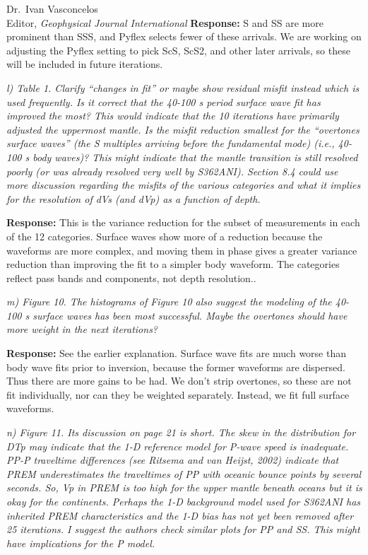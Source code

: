 \documentclass[11pt,a4paper]{letter}
\newcommand{\response}[1]{\textbf{Response:} #1}
\newcommand{\rev}[1]{{\it{#1}}}
\begin{document}
\begin{letter}{Dr.~Ivan Vasconcelos\\
Editor, \textit{Geophysical Journal International}}
\response{S and SS are more prominent than SSS, and Pyflex selects fewer of these arrivals. We are working on adjusting the Pyflex setting to pick ScS, ScS2, and other later arrivals, so these will be included in future iterations.}

\rev{l) Table 1. Clarify ``changes in fit'' or maybe show residual misfit instead which is used frequently. Is it correct that the 40-100 s period surface wave fit has improved the most? This would indicate that the 10 iterations have primarily adjusted the uppermost mantle.
Is the misfit reduction smallest for the ``overtones surface waves'' (the S multiples arriving before the fundamental mode) (i.e., 40-100 s body waves)?
This might indicate that the mantle transition is still resolved poorly (or was already resolved very well by S362ANI).
Section 8.4 could use more discussion regarding the misfits of the various categories and what it implies for the resolution of dVs (and dVp) as a function of depth.
}

\response{This is the variance reduction for the subset of measurements in each of the 12 categories. Surface waves show more of a reduction because the waveforms are more complex, and moving them in phase gives a greater variance reduction than improving the fit to a simpler body waveform. The categories reflect pass bands and components, not depth resolution..}

\rev{m) Figure 10. The histograms of Figure 10 also suggest the modeling of the 40-100 s surface waves has been most successful. Maybe the overtones should have more weight in the next iterations?
}

\response{See the earlier explanation.
Surface wave fits are much worse than body wave fits prior to inversion, because the former waveforms are dispersed.
Thus there are more gains to be had. We don't strip overtones, so these are not fit individually, nor can they be weighted separately.
Instead, we fit full surface waveforms.
}

\rev{n) Figure 11. Its discussion on page 21 is short. The skew in the distribution for DTp may indicate that the 1-D reference model for P-wave speed is inadequate. PP-P traveltime differences (see Ritsema and van Heijst, 2002) indicate that PREM underestimates the traveltimes of PP with oceanic bounce points by several seconds.
So, Vp in PREM is too high for the upper mantle beneath oceans but it is okay for the continents. Perhaps the 1-D background model used for S362ANI has inherited PREM characteristics and the 1-D bias has not yet been removed after 25 iterations.
I suggest the authors check similar plots for PP and SS. This might have implications for the P model.
}


\end{letter}
\end{document}
